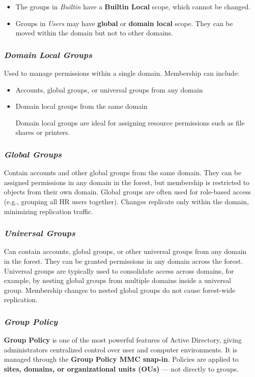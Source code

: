 \begin{itemize}
\item The groups in \textit{Builtin} have a \textbf{Builtin Local} scope, which cannot be changed.
\item Groups in \textit{Users} may have \textbf{global} or \textbf{domain local} scope. They can be moved within the domain but not to other domains.
\end{itemize}

\subsubsection{\textit{Domain} \textit{Local Groups}}
 Used to manage permissions within a single domain. Membership can include:
\begin{itemize}
    \item Accounts, global groups, or universal groups from any domain
    \item Domain local groups from the same domain

Domain local groups are ideal for assigning resource permissions such as file shares or printers.
\end{itemize}

\subsubsection{\textit{Global Groups}}
Contain accounts and other global groups from the same domain. They can be assigned permissions in any domain in the forest, but membership is restricted to objects from their own domain. Global groups are often used for role-based access (e.g., grouping all HR users together). Changes replicate only within the domain, minimizing replication traffic.

\subsubsection{\textit{Universal Groups}}
Can contain accounts, global groups, or other universal groups from any domain in the forest. They can be granted permissions in any domain across the forest. Universal groups are typically used to consolidate access across domains, for example, by nesting global groups from multiple domains inside a universal group. Membership changes to nested global groups do not cause forest-wide replication.

\subsubsection{\textit{Group Policy}}
\textbf{Group Policy} is one of the most powerful features of Active Directory, giving administrators centralized control over user and computer environments. It is managed through the \textbf{Group Policy MMC snap-in}. Policies are applied to \textbf{sites, domains, or organizational units (OUs)} — not directly to groups.

